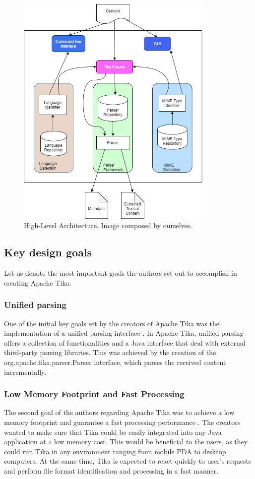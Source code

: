 \documentclass{article}
\begin{document}
\begin{figure}[ht]
    \centering
    \includegraphics[width=0.85\textwidth]{report/images/tika_architecture.png}
    \caption{High-Level Architecture. Image composed by ourselves.}
    \label{fig:architectur}
\end{figure}

\subsection{Key design goals}
Let us denote the most important goals the authors set out to accomplish in creating Apache Tika.
\subsubsection{Unified parsing}
One of the initial key goals set by the creators of Apache Tika was the implementation of a unified parsing interface \citep{tika_in_action}.  In Apache Tika, unified parsing offers a collection of functionalities and a Java interface that deal with external third-party parsing libraries. This was achieved by the creation of the org.apache.tika.parser.Parser interface, which parses the received content incrementally.

\subsubsection{Low Memory Footprint and Fast Processing}
The second goal of the authors regarding Apache Tika was to achieve a low memory footprint and guarantee a fast processing performance \citep{tika_in_action}. The creators wanted to make sure that Tika could be easily integrated into any Java application at a low memory cost. This would be beneficial to the users, as they could run Tika in any environment ranging from mobile PDA to desktop computers. At the same time, Tika is expected to react quickly to user’s requests and perform file format identification and processing in a fast manner.
\end{document}
